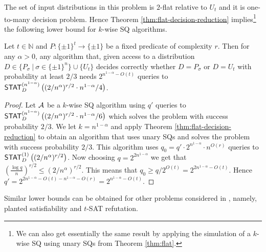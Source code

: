 The set of input distributions in this problem is $2$-flat relative to $U_t$ and it is one-to-many decision problem. Hence Theorem \ref{thm:flat-decision-reduction} implies\footnote{We can also get essentially the same result by applying the simulation of a $k$-wise SQ using unary SQs from Theorem \ref{thm:flat}.} the following lower bound for $k$-wise SQ algorithms.
\begin{theorem}\label{thm:csp-k-wise}
Let $t \in \mathbb{N}$ and $P: \{\pm 1\}^t \to \{\pm 1\}$ be a fixed predicate of complexity $r$. Then for any $\alpha >0$, any  algorithm that, given access to a distribution $D \in \{P_\sigma\ |\  \sigma  \in \{\pm 1 \}^n\} \cup \{U_t\}$  decides correctly whether $D = P_\sigma$ or $D=U_t$ with probability at least $2/3$ needs $2^{n^{1-\alpha} -O(t)}$ queries to $\mathsf{STAT}^{(n^{1-\alpha})}_D\left((2/n^{\alpha})^{r/2}  \cdot n^{1-\alpha}/4\right)$.
\end{theorem}
\begin{proof}
Let $\mathcal{A}$ be a $k$-wise SQ algorithm using $q'$ queries to $\mathsf{STAT}^{(n^{1-\alpha})}_D\left((2/n^{\alpha})^{r/2} \cdot n^{1-\alpha}/6\right)$ which solves the problem with success probability $2/3$.
We let $k=n^{1-\alpha}$ and apply Theorem \ref{thm:flat-decision-reduction} to obtain an algorithm that uses unary SQs and solves the problem with success probability $2/3$. This algorithm uses $q_0 = q' \cdot 2^{n^{1-\alpha}} \cdot n^{O(r)}$ queries to $\mathsf{STAT}^{(1)}_D\left((2/n^{\alpha})^{r/2}\right)$. Now choosing $q = 2^{2n^{1-\alpha}}$ we get that $\left(\frac{\log q}{n}\right)^{r/2} \leq (2/n^{\alpha})^{r/2}$. This means that $q_0 \geq q/2^{O(t)} = 2^{2n^{1-\alpha}- O(t)}$.
Hence $q' = 2^{2n^{1-\alpha}-O(t) - n^{1-\alpha}- O(r)} = 2^{n^{1-\alpha} -O(t)}$.
\end{proof}
Similar lower bounds can be obtained for other problems considered in \cite{FeldmanPV:13}, namely, planted satisfiability and $t$-SAT refutation.

